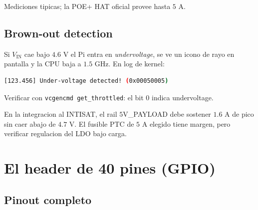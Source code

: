 \documentclass[11pt,a4paper,oneside]{report}
\begin{document}
Mediciones tipicas; la POE+ HAT oficial provee hasta $5$ A.

\section{Brown-out detection}

Si $V_{\text{IN}}$ cae bajo $4.6$ V el Pi entra en \emph{undervoltage}, se
ve un icono de rayo en pantalla y la CPU baja a $1.5$ GHz. En log de kernel:

\begin{lstlisting}[language=bash]
[123.456] Under-voltage detected! (0x00050005)
\end{lstlisting}

Verificar con \texttt{vcgencmd get\_throttled}: el bit 0 indica undervoltage.

\begin{cuidado}
En la integracion al INTISAT, el rail $5$V\_PAYLOAD debe sostener $1.6$ A
de pico sin caer abajo de $4.7$ V. El fusible PTC de $5$ A elegido tiene
margen, pero verificar regulacion del LDO bajo carga.
\end{cuidado}

\chapter{El header de 40 pines (GPIO)}

\section{Pinout completo}
\end{document}
